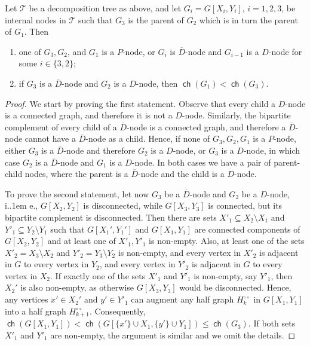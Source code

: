 \documentclass{article}
\makeatletter
\newcommand{\cT}{\ensuremath{\mathcal{T}}}
\newcommand*\ie{i.\kern.1em e.\@\xspace} %
\DeclareMathOperator\ch{\mathsf{ch}}
\makeatother
\begin{document}
\begin{claim}
	\label{cl: Qk-properties}
	Let $\cT$ be a decomposition tree as above, and
	let $G_i = G[X_i, Y_i]$, $i = 1,2,3$, be internal nodes in $\cT$ such that 
	$G_3$ is the parent of $G_2$ which is in turn the parent of $G_1$.
	Then 
	\begin{enumerate}[label=\textup{(\arabic*)}]
		\item one of $G_3, G_2$, and $G_1$ is a $P$-node, or $G_i$ is $\overline D$-node and $G_{i-1}$ is a $D$-node for some $i \in \{3,2\}$;
		\item if $G_3$ is a $\overline D$-node and $G_2$ is a $D$-node, then $\ch(G_1) < \ch(G_3)$.
	\end{enumerate}
\end{claim}
\begin{proof}
	We start by proving the first statement. Observe that every child a $D$-node is a connected graph, and therefore
	it is not a $D$-node. Similarly, the bipartite complement of every child of a $\overline D$-node is a connected graph,
	and therefore a $\overline D$-node cannot have a $\overline D$-node as a child.
	Hence, if none of $G_3, G_2, G_1$ is a $P$-node, either $G_3$ is a $\overline D$-node and therefore $G_2$ is a 
	$D$-node, or $G_3$ is a $D$-node, in which case $G_2$ is a $\overline D$-node and $G_1$ is a $D$-node.
	In both cases we have a pair of parent-child nodes, where the parent is a $\overline D$-node and the child is 
	a $D$-node.
	
	To prove the second statement, let now $G_3$ be a $\overline D$-node and $G_2$ be a $D$-node, \ie, 
	$G[X_2,Y_2]$ is disconnected, while $G[X_3,Y_3]$ is connected, but its bipartite complement is disconnected. 
	Then there are sets $X'_1 \subseteq X_2 \setminus X_1$ and $Y'_1 \subseteq Y_2 \setminus Y_1$ such that
	$G[X_1',Y_1']$ and $G[X_1,Y_1]$ are connected components of $G[X_2,Y_2]$ and at least one of $X'_1,Y'_1$ is non-empty.
	Also, at least one of the sets $X'_2 = X_3 \setminus X_2$ and $Y'_2 = Y_3 \setminus Y_2$ is non-empty,
	and every vertex in $X'_2$ is adjacent in $G$ to every vertex in $Y_2$, and
	every vertex in $Y'_2$ is adjacent in $G$ to every vertex in $X_2$. 
	If exactly one of the sets $X'_1$ and $Y'_1$ is non-empty, say $Y'_1$, then $X_2'$ is also non-empty, as otherwise  $G[X_3,Y_3]$ would be disconnected. Hence, any vertices $x' \in X_2'$ and $y' \in Y'_1$
	can augment any half graph $H^{\circ\circ}_k$ in $G[X_1,Y_1]$ into a half graph $H^{\circ\circ}_{k+1}$.
	Consequently, $\ch(G[X_1,Y_1]) < \ch(G[\{ x'\} \cup X_1, \{ y' \} \cup Y_1]) \leq \ch(G_3)$.
	If both sets $X'_1$ and $Y'_1$ are non-empty, the argument is similar and we omit the details.
\end{proof}
\end{document}
